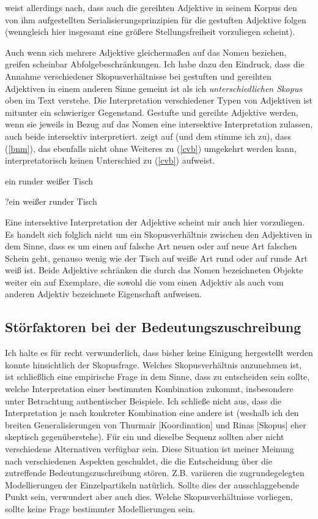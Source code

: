 {\citet[381--383]{Trost2006} weist allerdings nach, dass auch die gereihten Adjektive in seinem Korpus den von ihm aufgestellten Serialisierungsprinzipien für die gestuften Adjektive folgen (wenngleich hier insgesamt eine größere Stellungsfreiheit vorzuliegen scheint). 

Auch wenn sich mehrere Adjektive gleichermaßen auf das Nomen beziehen, greifen scheinbar Abfolgebeschränkungen. Ich habe dazu den Eindruck, dass die Annahme verschiedener Skopusverhältnisse bei gestuften und gereihten Adjektiven in einem anderen Sinne gemeint ist als ich \textit{unterschiedlichen Skopus} oben im Text verstehe. Die Interpretation verschiedener Typen von Adjektiven ist mitunter ein schwieriger Gegenstand. Gestufte und gereihte Adjektive werden, wenn sie jeweils in Bezug auf das Nomen eine intersektive Interpretation zulassen, auch beide intersektiv interpretiert. \citet[60--61]{Posner1980} zeigt auf (und dem stimme ich zu), dass (\ref{bnm}), das ebenfalls nicht ohne Weiteres zu (\ref{cvb}) umgekehrt werden kann, interpretatorisch keinen Unterschied zu (\ref{cvb}) aufweist.

\begin{exe}
	\ex\label{bnm} 
	ein runder weißer Tisch
\end{exe}
\begin{exe}
	\ex\label{cvb} 
	?ein weißer runder Tisch
	\hfill\hbox{\citet[63]{Posner1980}}
\end{exe}
Eine intersektive Interpretation der Adjektive scheint mir auch hier vorzuliegen. Es handelt sich folglich nicht um ein Skopusverhältnis zwischen den Adjektiven in dem Sinne, dass es um einen auf falsche Art neuen oder auf neue Art falschen Schein geht, genauso wenig wie der Tisch auf weiße Art rund oder auf runde Art weiß ist. Beide Adjektive schränken die durch das Nomen bezeichneten Objekte weiter ein auf Exemplare, die sowohl die vom einen Adjektiv als auch vom anderen Adjektiv bezeichnete Eigenschaft aufweisen.}
 
\subsection{Störfaktoren bei der Bedeutungszuschreibung}
Ich halte es für recht verwunderlich, dass bisher keine Einigung hergestellt werden konnte hinsichtlich der Skopusfrage. Welches Skopusverhältnis anzunehmen ist, ist schließlich eine empirische Frage in dem Sinne, dass zu entscheiden sein sollte, welche Interpretation einer bestimmten Kombination zukommt, insbesondere unter Betrachtung authentischer Beispiele. Ich schließe nicht aus, dass die Interpretation je nach konkreter Kombination eine andere ist (weshalb ich den breiten Generalisierungen von Thurmair [Koordination] und Rinas [Skopus] eher skeptisch gegenüberstehe). Für ein und dieselbe Sequenz sollten aber nicht verschiedene Alternativen verfügbar sein. Diese Situation ist meiner Meinung nach verschiedenen Aspekten geschuldet, die die Entscheidung über die zutreffen\-de Bedeutungszuschreibung stören. Z.B. variieren die zugrundegelegten Modellie\-rungen der Einzelpartikeln natürlich. Sollte dies der ausschlaggebende Punkt sein, verwundert aber auch dies. Welche Skopusverhältnisse vorliegen, sollte keine Frage bestimmter Modellierungen sein. 

